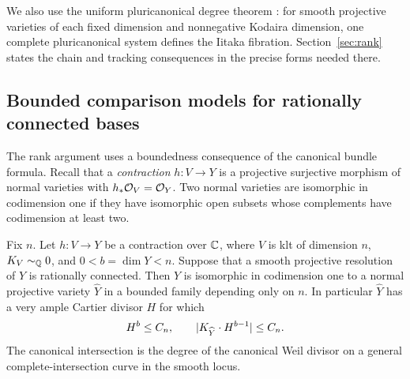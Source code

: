We also use the uniform pluricanonical degree theorem
\citep[Theorem~1.1]{UPI}: for smooth projective varieties of each fixed
dimension and nonnegative Kodaira dimension, one complete pluricanonical
system defines the Iitaka fibration. Section~\ref{sec:rank} states the
chain and tracking consequences in the precise forms needed there.

\subsection{Bounded comparison models for rationally connected bases}

The rank argument uses a boundedness consequence of the canonical bundle
formula. Recall that a \emph{contraction} $h:V\to Y$ is a projective
surjective morphism of normal varieties with $h_*\mathcal O_V=\mathcal O_Y$.
Two normal varieties are isomorphic in codimension one if they have
isomorphic open subsets whose complements have codimension at least two.

\begin{proposition}\label{input:bounded-base}
Fix $n$. Let $h:V\to Y$ be a contraction over $\mathbb C$, where $V$ is
klt of dimension $n$, $K_V\sim_{\mathbb Q}0$, and $0<b=\dim Y<n$.
Suppose that a smooth projective resolution of $Y$ is rationally
connected. Then $Y$ is isomorphic in codimension one to a normal
projective variety $\widehat Y$ in a bounded family depending only
on $n$. In particular $\widehat Y$ has a very ample Cartier divisor
$H$ for which
\begin{equation}\label{eq:bounded-base-degrees}
            H^b\le C_n,\qquad
            \lvert K_{\widehat Y}\cdot H^{b-1}\rvert\le C_n.
\end{equation}
The canonical intersection is the degree of the canonical Weil
divisor on a general complete-intersection curve in the smooth locus.
\end{proposition}

